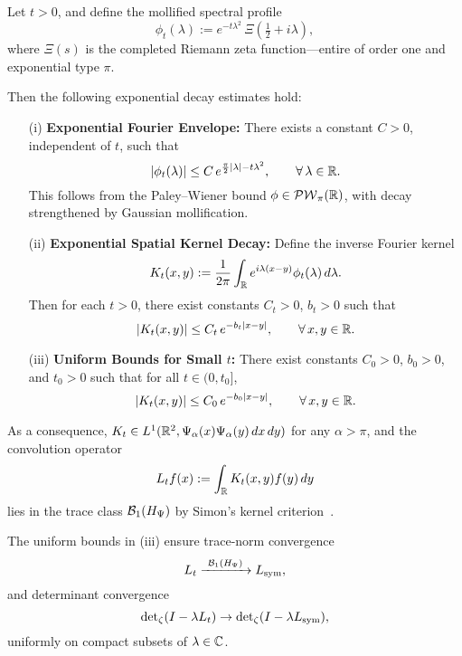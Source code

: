 \begin{lemma}
\label{lem:decay_mollified_kernel}
Let \( t > 0 \), and define the mollified spectral profile
\[
\phi_t(\lambda) := e^{-t\lambda^2} \, \Xi\left(\tfrac{1}{2} + i\lambda\right),
\]
where \( \Xi(s) \) is the completed Riemann zeta function—entire of order one and exponential type \( \pi \).

Then the following exponential decay estimates hold:
\begin{enumerate}
    \item[\textup{(i)}] \textbf{Exponential Fourier Envelope:} There exists a constant \( C > 0 \), independent of \( t \), such that
    \[
    |\phi_t(\lambda)| \le C \, e^{\frac{\pi}{2}|\lambda| - t\lambda^2}, \qquad \forall\, \lambda \in \mathbb{R}.
    \]
    This follows from the Paley--Wiener bound \( \phi \in \mathcal{PW}_{\pi}(\mathbb{R}) \), with decay strengthened by Gaussian mollification.

    \item[\textup{(ii)}] \textbf{Exponential Spatial Kernel Decay:} Define the inverse Fourier kernel
    \[
    K_t(x,y) := \frac{1}{2\pi} \int_{\mathbb{R}} e^{i\lambda(x - y)} \phi_t(\lambda)\,d\lambda.
    \]
    Then for each \( t > 0 \), there exist constants \( C_t > 0 \), \( b_t > 0 \) such that
    \[
    |K_t(x,y)| \le C_t\, e^{-b_t |x - y|}, \qquad \forall\, x, y \in \mathbb{R}.
    \]

    \item[\textup{(iii)}] \textbf{Uniform Bounds for Small \( t \):} There exist constants \( C_0 > 0 \), \( b_0 > 0 \), and \( t_0 > 0 \) such that for all \( t \in (0, t_0] \),
    \[
    |K_t(x,y)| \le C_0\, e^{-b_0 |x - y|}, \qquad \forall\, x, y \in \mathbb{R}.
    \]
\end{enumerate}

\noindent
As a consequence, \( K_t \in L^1(\mathbb{R}^2, \Psi_\alpha(x)\Psi_\alpha(y)\, dx\,dy) \) for any \( \alpha > \pi \), and the convolution operator
\[
L_t f(x) := \int_{\mathbb{R}} K_t(x,y) f(y)\, dy
\]
lies in the trace class \( \mathcal{B}_1(H_{\Psi}) \) by Simon’s kernel criterion~\cite[Thm.~4.2]{Simon2005TraceIdeals}.

\medskip
\noindent
The uniform bounds in \textup{(iii)} ensure trace-norm convergence
\[
L_t \xrightarrow{\ \TC(\HPsi)\ } \Lsym,
\]
and determinant convergence
\[
\det\nolimits_{\zeta}(I - \lambda L_t) \to \det\nolimits_{\zeta}(I - \lambda L_{\mathrm{sym}}),
\]
uniformly on compact subsets of \( \lambda \in \mathbb{C} \).
\end{lemma}
